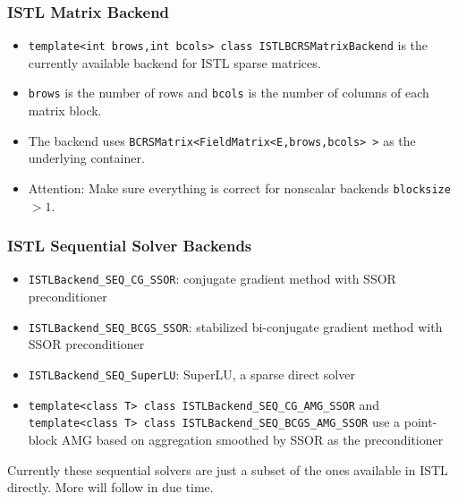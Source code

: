 \begin{frame}
  \frametitle{ISTL Matrix Backend}
  \begin{itemize} 
    \item \lstinline!template<int brows,int bcols> class ISTLBCRSMatrixBackend!
      is the currently available backend for ISTL sparse
      matrices.
    \item \lstinline!brows! is the number of rows and \lstinline!bcols!
      is the number of columns of each matrix block.
  \item The backend uses
    \lstinline!BCRSMatrix<FieldMatrix<E,brows,bcols> >! as the
    underlying container.
  \item Attention: Make sure everything is correct for nonscalar backends
    \lstinline!blocksize!$>1$.
  \end{itemize}
\end{frame}
\begin{frame}[fragile]
  \frametitle{ISTL Sequential Solver Backends}
    \begin{itemize}
    \item \lstinline!ISTLBackend_SEQ_CG_SSOR!:  conjugate gradient method with SSOR preconditioner
    \item \lstinline!ISTLBackend_SEQ_BCGS_SSOR!: stabilized bi-conjugate gradient
      method with SSOR preconditioner
    \item \lstinline!ISTLBackend_SEQ_SuperLU!: SuperLU, a sparse
      direct solver
    \item \lstinline!template<class T> class ISTLBackend_SEQ_CG_AMG_SSOR! and
      \lstinline!template<class T> class ISTLBackend_SEQ_BCGS_AMG_SSOR! 
      use a point-block AMG based on aggregation smoothed by SSOR as
      the preconditioner
    \end{itemize}
    Currently these sequential solvers are just a subset of the ones
  available in ISTL directly. More will follow in due time.
\end{frame}

